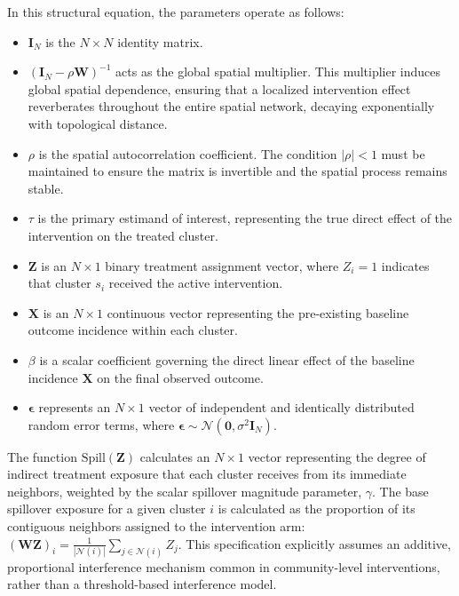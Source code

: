 \documentclass[11pt]{article}
\begin{document}
In this structural equation, the parameters operate as follows:
\begin{itemize}
    \item $\bm{I}_N$ is the $N \times N$ identity matrix.
    \item $(\bm{I}_N - \rho \bm{W})^{-1}$ acts as the global spatial multiplier. This multiplier induces global spatial dependence, ensuring that a localized intervention effect reverberates throughout the entire spatial network, decaying exponentially with topological distance.
    \item $\rho$ is the spatial autocorrelation coefficient. The condition $|\rho| < 1$ must be maintained to ensure the matrix is invertible and the spatial process remains stable.
    \item $\tau$ is the primary estimand of interest, representing the true direct effect of the intervention on the treated cluster.
    \item $\bm{Z}$ is an $N \times 1$ binary treatment assignment vector, where $Z_i = 1$ indicates that cluster $s_i$ received the active intervention.
    \item $\bm{X}$ is an $N \times 1$ continuous vector representing the pre-existing baseline outcome incidence within each cluster.
    \item $\beta$ is a scalar coefficient governing the direct linear effect of the baseline incidence $\bm{X}$ on the final observed outcome.
    \item $\bm{\epsilon}$ represents an $N \times 1$ vector of independent and identically distributed random error terms, where $\bm{\epsilon} \sim \mathcal{N}(\bm{0}, \sigma^2 \bm{I}_N)$.
\end{itemize}

The function $\text{Spill}(\bm{Z})$ calculates an $N \times 1$ vector representing the degree of indirect treatment exposure that each cluster receives from its immediate neighbors, weighted by the scalar spillover magnitude parameter, $\gamma$. The base spillover exposure for a given cluster $i$ is calculated as the proportion of its contiguous neighbors assigned to the intervention arm: $(\bm{W}\bm{Z})_i = \frac{1}{|\mathcal{N}(i)|} \sum_{j \in \mathcal{N}(i)} Z_j$. This specification explicitly assumes an additive, proportional interference mechanism common in community-level interventions, rather than a threshold-based interference model.
\end{document}
